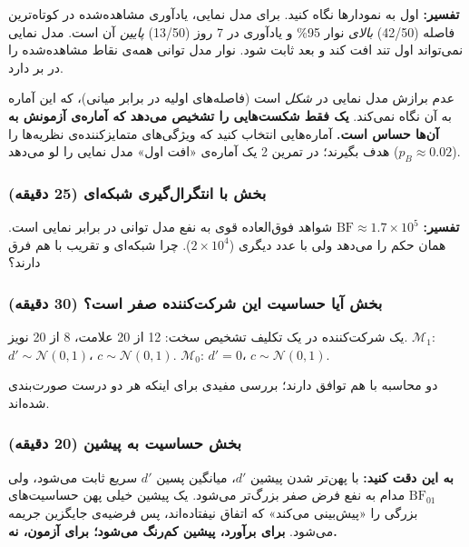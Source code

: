 \textbf{تفسیر:} اول به نمودارها نگاه کنید. برای مدل نمایی، یادآوری
مشاهده‌شده در کوتاه‌ترین فاصله (42/50) \emph{بالای} نوار 95\% و یادآوری در
7 روز (13/50) \emph{پایین} آن است. مدل نمایی نمی‌تواند اول تند افت کند و
بعد ثابت شود. نوار مدل توانی همه‌ی نقاط مشاهده‌شده را در بر دارد.

عدم برازش مدل نمایی در \emph{شکل} است (فاصله‌های اولیه در برابر میانی)،
که این آماره به آن نگاه نمی‌کند. \textbf{یک  فقط شکست‌هایی را
تشخیص می‌دهد که آماره‌ی آزمونش به آن‌ها حساس است.} آماره‌هایی انتخاب کنید که
ویژگی‌های متمایزکننده‌ی نظریه‌ها را هدف بگیرند؛ در تمرین 2 یک آماره‌ی «افت
اول» مدل نمایی را لو می‌دهد (\(p_B \approx 0.02\)).

\subsubsection{\texorpdfstring{بخش  با انتگرال‌گیری
شبکه‌ای (25
دقیقه)}{بخش B: Bayes factor با انتگرال‌گیری شبکه‌ای (25 دقیقه)}}

\textbf{تفسیر:} \(\mathrm{BF} \approx 1.7 \times 10^5\) شواهد فوق‌العاده
قوی به نفع مدل توانی در برابر نمایی است.  همان حکم را می‌دهد ولی
با عدد دیگری (\(2 \times 10^4\)). چرا  شبکه‌ای و تقریب
 با هم فرق دارند؟

\subsubsection{\texorpdfstring{بخش  آیا حساسیت
این شرکت‌کننده صفر است؟ (30
دقیقه)}{بخش C: Savage\lr{--}Dickey: آیا حساسیت این شرکت‌کننده صفر است؟ (30 دقیقه)}}

یک شرکت‌کننده در یک تکلیف تشخیص سخت: 12  از 20  علامت،
8  از 20  نویز. \(\mathcal{M}_1\):
\(d' \sim \mathcal{N}(0, 1)\)، \(c \sim \mathcal{N}(0, 1)\).
\(\mathcal{M}_0\): \(d' = 0\)، \(c \sim \mathcal{N}(0, 1)\).

دو محاسبه با هم توافق دارند؛ بررسی مفیدی برای اینکه هر دو درست صورت‌بندی
شده‌اند.

\subsubsection{\texorpdfstring{بخش  حساسیت به پیشین (20
دقیقه)}{بخش D: حساسیت به پیشین (20 دقیقه)}}

\textbf{به این دقت کنید:} با پهن‌تر شدن پیشین \(d'\)، میانگین پسین \(d'\)
سریع ثابت می‌شود، ولی \(\mathrm{BF}_{01}\) مدام به نفع فرض صفر بزرگ‌تر
می‌شود. یک پیشین خیلی پهن حساسیت‌های بزرگی را «پیش‌بینی می‌کند» که اتفاق
نیفتاده‌اند، پس فرضیه‌ی جایگزین جریمه می‌شود. \textbf{برای برآورد، پیشین
کم‌رنگ می‌شود؛ برای آزمون، نه.}

